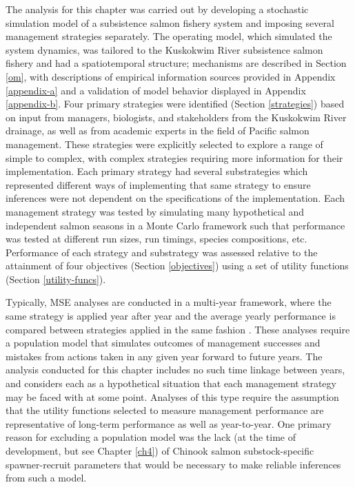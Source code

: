 \documentclass[12pt,]{book}
\theoremstyle{definition}
\theoremstyle{definition}
\theoremstyle{definition}
\theoremstyle{remark}
\begin{document}
\noindent
The analysis for this chapter was carried out by developing a stochastic
simulation model of a subsistence salmon fishery system and imposing
several management strategies separately. The operating model, which
simulated the system dynamics, was tailored to the Kuskokwim River
subsistence salmon fishery and had a spatiotemporal structure;
mechanisms are described in Section \ref{om}, with descriptions of
empirical information sources provided in Appendix \ref{appendix-a} and
a validation of model behavior displayed in Appendix \ref{appendix-b}.
Four primary strategies were identified (Section \ref{strategies}) based
on input from managers, biologists, and stakeholders from the Kuskokwim
River drainage, as well as from academic experts in the field of Pacific
salmon management. These strategies were explicitly selected to explore
a range of simple to complex, with complex strategies requiring more
information for their implementation. Each primary strategy had several
substrategies which represented different ways of implementing that same
strategy to ensure inferences were not dependent on the specifications
of the implementation. Each management strategy was tested by simulating
many hypothetical and independent salmon seasons in a Monte Carlo
framework such that performance was tested at different run sizes, run
timings, species compositions, etc. Performance of each strategy and
substrategy was assessed relative to the attainment of four objectives
(Section \ref{objectives}) using a set of utility functions (Section
\ref{utility-funcs}).

Typically, MSE analyses are conducted in a multi-year framework, where
the same strategy is applied year after year and the average yearly
performance is compared between strategies applied in the same fashion
\citep{cooke-1999}. These analyses require a population model that
simulates outcomes of management successes and mistakes from actions
taken in any given year forward to future years. The analysis conducted
for this chapter includes no such time linkage between years, and
considers each as a hypothetical situation that each management strategy
may be faced with at some point. Analyses of this type require the
assumption that the utility functions selected to measure management
performance are representative of long-term performance as well as
year-to-year. One primary reason for excluding a population model was
the lack (at the time of development, but see Chapter \ref{ch4}) of
Chinook salmon substock-specific spawner-recruit parameters that would
be necessary to make reliable inferences from such a model.
\end{document}
